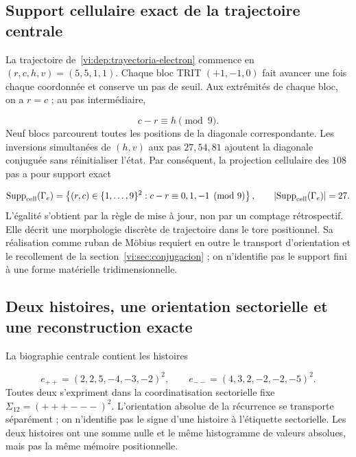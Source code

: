 \subsection{Support cellulaire exact de la trajectoire centrale
}

La trajectoire de~\eqref{vi:dep:trayectoria-electron} commence en
$(r,c,h,v)=(5,5,1,1)$. Chaque bloc TRIT $(+1,-1,0)$ fait avancer une fois chaque
coordonnée et conserve un pas de seuil. Aux extrémités de chaque bloc, on
a $r=c$ ; au pas intermédiaire,

\[
 c-r\equiv h\pmod 9.
\]
Neuf blocs parcourent toutes les positions de la diagonale correspondante.
Les inversions simultanées de $(h,v)$ aux pas $27,54,81$ ajoutent la
diagonale conjuguée sans réinitialiser l’état. Par conséquent, la projection
cellulaire des $108$ pas a pour support exact

\begin{equation}
 \operatorname{Supp}_{\rm cell}(\Gamma_e)
 =\left\{(r,c)\in\{1,\ldots,9\}^2:
 c-r\equiv0,1,-1\pmod9\right\},
 \qquad
 \left|\operatorname{Supp}_{\rm cell}(\Gamma_e)\right|=27.
 \label{vi:eq:soporte-electron-27}
\end{equation}
L’égalité s’obtient par la règle de mise à jour, non par un comptage
rétrospectif. Elle décrit une morphologie discrète de trajectoire dans le tore
positionnel. Sa réalisation comme ruban de Möbius requiert en outre le transport
d’orientation et le recollement de la section~\ref{vi:sec:conjugacion} ; on
n’identifie pas le support fini à une forme matérielle tridimensionnelle.


\subsection{Deux histoires, une orientation sectorielle et une reconstruction exacte
}

La biographie centrale contient les histoires

\begin{equation}
 e_{++}=(2,2,5,-4,-3,-2)^2,
 \qquad
 e_{--}=(4,3,2,-2,-2,-5)^2.
 \label{vi:eq:historias-electronicas}
\end{equation}
Toutes deux s’expriment dans la coordinatisation sectorielle fixe
$\Sigma_{12}=(+++---)^2$. L’orientation absolue de la récurrence se
transporte séparément ; on n’identifie pas le signe d’une histoire à
l’étiquette sectorielle. Les deux histoires ont une somme nulle et le même histogramme
de valeurs absolues, mais pas la même mémoire positionnelle.


